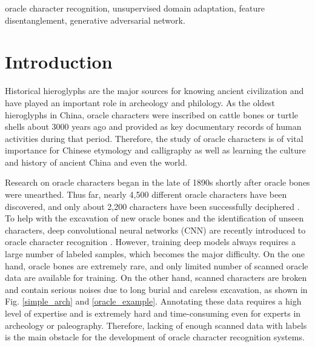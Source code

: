 \documentclass[10pt,journal,compsoc,twocolumn ]{IEEEtran}
\begin{document}
\begin{keywords}
oracle character recognition, unsupervised domain adaptation, feature disentanglement, generative adversarial network.
\end{keywords}

\section{Introduction}

Historical hieroglyphs are the major sources for knowing ancient civilization and have played an important role in archeology and philology. As the oldest hieroglyphs in China, oracle characters \cite{flad2008divination,keightley1997graphs} were inscribed on cattle bones or turtle shells about 3000 years ago and provided as key documentary records of human activities during that period. Therefore, the study of oracle characters is of vital importance for Chinese etymology and calligraphy as well as learning the culture and history of ancient China and even the world.

Research on oracle characters began in the late of 1890s shortly after oracle bones were unearthed. Thus far, nearly 4,500 different oracle characters have been discovered, and only about 2,200 characters have been successfully deciphered \cite{li2020hwobc,huang2019obc306}. To help with the excavation of new oracle bones and the identification of unseen characters, deep convolutional neural networks (CNN) \cite{krizhevsky2012imagenet,simonyan2014very,szegedy2015going,he2016deep} are recently introduced to oracle character recognition \cite{guo2015building, huang2019obc306,zhang2019oracle}. However, training deep models always requires a large number of labeled samples, which becomes the major difficulty. %
On the one hand, oracle bones are extremely rare, and only limited number of scanned oracle data are available for training. On the other hand, %
scanned characters are broken and contain serious noises due to long burial and careless excavation, as shown in Fig. \ref{simple_arch} and \ref{oracle_example}. Annotating these data requires a high level of expertise and is extremely hard and time-consuming even for experts in archeology or paleography. Therefore, lacking of enough scanned data with labels is the main obstacle for the development of oracle character recognition systems.
\end{document}
